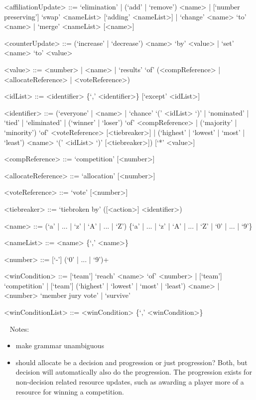 \documentclass{article}
\begin{document}
\begin{grammar}
<affiliationUpdate> ::= `elimination' | (`add' | `remove') <name> | 
[`number preserving'] `swap' <nameList> [`adding' <nameList>] | `change' <name> 
`to' <name> | `merge' <nameList> [<name>]

<counterUpdate> ::= (`increase' | `decrease') <name> `by' <value> | `set' 
<name> `to' <value> 

<value> ::= <number> | <name> | `results' `of' (<compReference> | 
<allocateReference> |
<voteReference>) %

<idList> ::= <identifier> \{`,' <identifier>\} [`except' <idList>]

<identifier> ::= (`everyone' | <name> | `chance' `(' <idList> `)' | `nominated' 
| 
`tied' | 
`eliminated' | (`winner' | `loser') `of' <compReference> | (`majority' | 
`minority') `of' <voteReference>  [<tiebreaker>] | (`highest' | `lowest' | 
`most' | `least') <name> `(' <idList> `)' [<tiebreaker>])
[`*' <value>]

<compReference> ::= `competition' [<number>] 

<allocateReference> ::= `allocation' [<number>]

<voteReference> ::= `vote' [<number>]

<tiebreaker> ::= `tiebroken by' ([<action>] <identifier>)

<name> ::= (`a' | ... | `z' | `A' | ... | `Z') \{`a' | ... | `z' | `A' | ... | 
`Z' | `0' | ... | `9'\}

<nameList> ::= <name> \{`,' <name>\}

<number> ::= [`-'] (`0' | ... | `9')+

<winCondition> ::= [`team'] `reach' <name> `of' <number> | [`team'] 
`competition' | [`team'] (`highest' | `lowest' | `most' | `least') <name> | 
<number> `member jury vote' | `survive'

<winConditionList> ::= <winCondition> \{`,' <winCondition>\}

\end{grammar}

~\newline
Notes:
\begin{itemize}
	\item make grammar unambiguous
	\item should allocate be a decision and progression or just progression? 
	Both, but decision will automatically also do the progression. The 
	progression exists for non-decision related resource updates, such as 
	awarding a player more of a resource for winning a competition.
\end{itemize}
\end{document}
